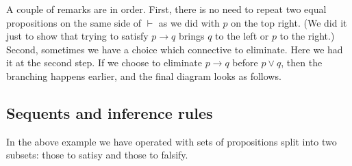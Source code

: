 A couple of remarks are in order.
First, there is no need to repeat two equal propositions on the same side of $\vdash$ as we did with $p$ on the top right.
(We did it just to show that trying to satisfy $p \to q$ brings $q$ to the left or $p$ to the right.)
Second, sometimes we have a choice which connective to eliminate.
Here we had it at the second step.
If we choose to eliminate $p \to q$ before $p \vee q$, then the branching happens earlier, and the final diagram looks as follows.
\begin{prooftree}
\end{prooftree}



\subsection{Sequents and inference rules}
In the above example we have operated with sets of propositions split into two subsets: those to satisy and those to falsify.